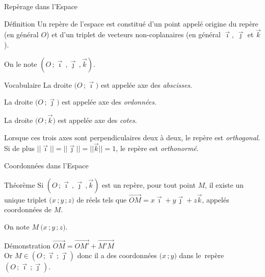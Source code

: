 \documentclass{cours}
\begin{document}
    \vspace{-0.7cm} %
    \begin{Gpartie}{Repèrage dans l'Espace} 
        \begin{Spartie}{Définition} 
            Un repère de l'espace est constitué d'un point appelé origine du repère (en général $O$) et d'un triplet de vecteurs non-coplanaires (en général $\vec{\imath}$, $\vec{\jmath}$ et $\vec{k}$).

            On le note $\left(O\,;\vec{\imath}\,,\vec{\jmath}\,,\vec{k}\right)$.
        \end{Spartie}
        \begin{Spartie}{Vocabulaire} 
            La droite $\big(O\,;\vec{\imath}\big)$ est appelée axe des \emph{abscisses}.

            La droite $\big(O\,;\vec{\jmath}\big)$ est appelée axe des \emph{ordonnées}.

            La droite $\big(O\,;\vec{k}\big)$ est appelée axe des \emph{cotes}.

            Lorsque ces trois axes sont perpendiculaires deux à deux, le repère est \emph{orthogonal}. \\ Si de plus $\lvert\lvert\vec{\imath}\rvert\rvert=\lvert\lvert\vec{\jmath}\rvert\rvert=\lvert\lvert\vec{k}\rvert\rvert=1$, le repère est \emph{orthonormé}.
        \end{Spartie}
        \pagebreak
        \begin{Spartie}{Coordonnées dans l'Espace} 
            \begin{SSpartie}{Théorème} 
                Si $\left(O\,;\vec{\imath}\,,\vec{\jmath}\,,\vec{k}\right)$ est un repère, pour tout point $M$, il existe un unique triplet $\big(x\,; y\,; z\big)$ de réels tels que $\overrightarrow{OM}=x\vec{\imath}+y\vec{\jmath}+z\vec{k}$, appelés coordonnées de $M$.

                On note $M~\big(x\,; y\,; z\big)$.
                \begin{SSSpartie}{Démonstration} 
                    $\overrightarrow{OM}=\overrightarrow{OM'}+\overrightarrow{M'M}$ \\
                    Or $M\in\left(O\,;\vec{\imath}\,;\vec{\jmath}\right)$ donc il a des coordonnées $\big(x\,; y\big)$ dans le~repère~$\left(O\,;\vec{\imath}\,;\vec{\jmath}\right)$.


\end{SSSpartie}
\end{SSpartie}
\end{Spartie}
\end{Gpartie}
\end{document}
